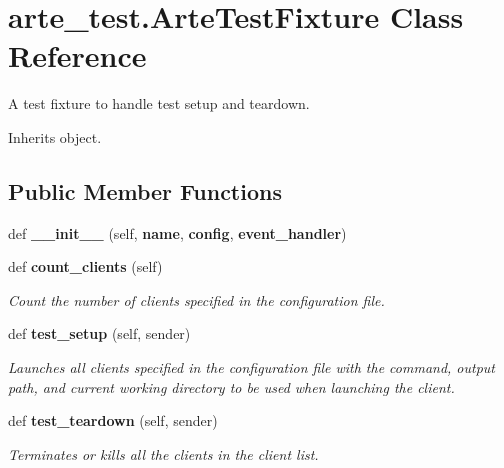 \section{arte\+\_\+test.\+Arte\+Test\+Fixture Class Reference}
\label{classarte__test_1_1_arte_test_fixture}


A test fixture to handle test setup and teardown.  




Inherits object.

\subsection*{Public Member Functions}
\begin{DoxyCompactItemize}
\item 
def {\bfseries \+\_\+\+\_\+init\+\_\+\+\_\+} (self, {\bf name}, {\bf config}, {\bf event\+\_\+handler})\label{classarte__test_1_1_arte_test_fixture_a619a89b940d44328e2625532f29275f9}

\item 
def {\bf count\+\_\+clients} (self)
\begin{DoxyCompactList}\small\item\em Count the number of clients specified in the configuration file. \end{DoxyCompactList}\item 
def {\bf test\+\_\+setup} (self, sender)
\begin{DoxyCompactList}\small\item\em Launches all clients specified in the configuration file with the command, output path, and current working directory to be used when launching the client. \end{DoxyCompactList}\item 
def {\bf test\+\_\+teardown} (self, sender)
\begin{DoxyCompactList}\small\item\em Terminates or kills all the clients in the client list. \end{DoxyCompactList}\end{DoxyCompactItemize}
